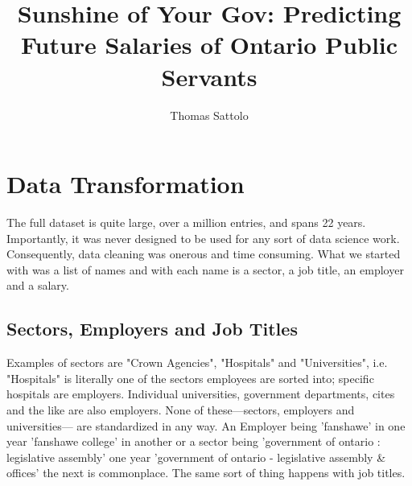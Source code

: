 \documentclass{article}
\begin{document}
\title{Sunshine of Your Gov: Predicting Future Salaries of Ontario Public Servants}

\author{Thomas Sattolo}

\maketitle

\section{Data Transformation}

The full dataset is quite large, over a million entries, and spans 22 years.
Importantly, it was never designed to be used for any sort of data science
work.  Consequently, data cleaning was onerous and time consuming. What we
started with was a list of names and with each name is a sector, a job title,
an employer and a salary.

\subsection{Sectors, Employers and Job Titles}

Examples of sectors are "Crown Agencies", "Hospitals" and "Universities", i.e.
"Hospitals" is literally one of the sectors employees are sorted into;
specific hospitals are employers.  Individual universities, government
departments, cites and the like are also employers.  None of these---sectors,
employers and universities--- are standardized in any way.  An Employer being
'fanshawe' in one year 'fanshawe college' in another or a sector being
'government of ontario : legislative assembly' one year  'government of ontario
- legislative assembly \& offices' the next is commonplace.  The same sort of
thing happens with job titles. 
\end{document}

